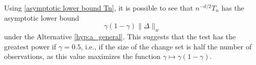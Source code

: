 \begin{remark} \label{remark:convergence n-d2 Tn}
    Using \eqref{asymptotic lower bound Tn}, it is possible to see that $n^{-d/2} T_n$ has the asymptotic lower bound \[ \gamma (1-\gamma) \| \Delta \|_w \] under the Alternative \ref{hyp:a_general}.
    This suggests that the test has the greatest power if $\gamma = 0.5$, i.e., if the size of the change set is half the number of observations, as this value maximizes the function $\gamma \mapsto \gamma (1-\gamma)$.
\end{remark}

